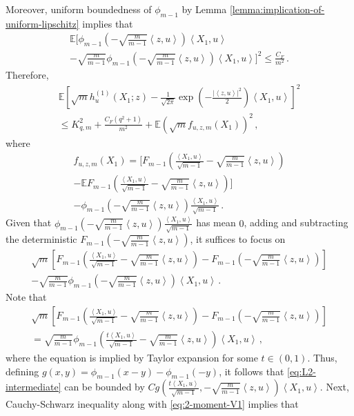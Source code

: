 \documentclass[12pt]{article}
\renewcommand{\exp}[1]{\operatorname{exp}\left(#1\right)} %
\def\l{\left}
\def\r{\right}
\newcommand{\mb}{\mathbb}
\newcommand{\dotp}[2]{\left\langle#1,#2\right\rangle}
\theoremstyle{thmstyletwo}%
\theoremstyle{thmstylethree}%
\begin{document}
    Moreover, uniform boundedness of $\phi_{m-1}$ by Lemma \ref{lemma:implication-of-uniform-lipschitz} implies that 
    \begin{multline*}
        \mb E \Biggl[\phi_{m-1}\l(-\sqrt{\frac{m}{m-1}}\dotp{z}{u}\r)\dotp{X_1}{u} \\
        - \sqrt{\frac{m}{m-1}}\phi_{m-1}\l(-\sqrt{\frac{m}{m-1}}\dotp{z}{u}\r)\dotp{X_1}{u}\Biggr]^2 \leq \frac{C_F}{m^2}\,.
    \end{multline*}
    Therefore,
    \begin{multline*}
        \mb E\l[\sqrt{m}h^{(1)}_{u}(X_1;z) - \frac{1}{\sqrt{2\pi}}\exp{-\frac{\l\lvert \dotp{z}{u}\r\rvert^2}{2}}\dotp{X_1}{u}\r]^2 \\
        \leq K_{q,m}^2 + \frac{C_F(q^2+1)}{m^2} + \mb E\l(\sqrt{m} f_{u,z,m}(X_1)\r)^2 \,,
    \end{multline*}
    where
    \begin{multline*}
        f_{u,z,m}(X_1) = \Biggl[F_{m-1}\left(\frac{\dotp{X_1}{u}}{\sqrt{m-1}} - \sqrt{\frac{m}{m-1}}\dotp{z}{u}\right) \\
        - \mb E F_{m-1}\left(\frac{\dotp{X_1}{u}}{\sqrt{m-1}} - \sqrt{\frac{m}{m-1}}\dotp{z}{u}\right)\Biggr] \\
        -  \phi_{m-1}\l(- \sqrt{\frac{m}{m-1}}\dotp{z}{u}\r)\frac{\dotp{X_1}{u}}{\sqrt{m-1}}\,.
    \end{multline*}
    Given that $\phi_{m-1}\l(- \sqrt{\frac{m}{m-1}}\dotp{z}{u}\r)\frac{\dotp{X_1}{u}}{\sqrt{m-1}}$ has mean $0$, adding and subtracting the deterministic $F_{m-1}\l(- \sqrt{\frac{m}{m-1}}\dotp{z}{u}\r)$, it suffices to focus on
    \begin{multline}\label{eq:L2-intermediate}
        \sqrt{m}\l[F_{m-1}\left(\frac{\dotp{X_1}{u}}{\sqrt{m-1}} - \sqrt{\frac{m}{m-1}}\dotp{z}{u}\right) - F_{m-1}\left(- \sqrt{\frac{m}{m-1}}\dotp{z}{u}\right)\r]\\
        - \sqrt{\frac{m}{m-1}}\phi_{m-1}\l(- \sqrt{\frac{m}{m-1}}\dotp{z}{u}\r)\dotp{X_1}{u}  \,.
    \end{multline}
    Note that
    \begin{multline*}
    \sqrt{m}\l[F_{m-1}\left(\frac{\dotp{X_1}{u}}{\sqrt{m-1}} - \sqrt{\frac{m}{m-1}}\dotp{z}{u}\right) - F_{m-1}\left(- \sqrt{\frac{m}{m-1}}\dotp{z}{u}\right)\r] \\
    = \sqrt{\frac{m}{m-1}} \phi_{m-1}\l(\frac{t\dotp{X_1}{u}}{\sqrt{m-1}} - \sqrt{\frac{m}{m-1}}\dotp{z}{u}\r) \dotp{X_1}{u}  \,,
    \end{multline*}
    where the equation is implied by Taylor expansion for some $t \in (0,1)$. Thus, defining $g(x,y) = \phi_{m-1}(x-y) - \phi_{m-1}(-y)$, it follows that \eqref{eq:L2-intermediate} can be bounded by $Cg\l(\frac{t\dotp{X_1}{u}}{\sqrt{m-1}}, - \sqrt{\frac{m}{m-1}}\dotp{z}{u}\r) \dotp{X_1}{u}$. Next, Cauchy-Schwarz inequality along with \eqref{eq:2-moment-V1} implies that
\end{document}
